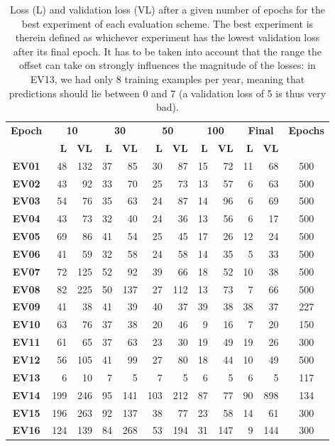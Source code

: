 \begin{table}[h!]
  \centering
  \begin{tabular}{crrrrrrrrrrc}
    \toprule
    \textbf{Epoch} & \multicolumn{2}{c}{\textbf{10}} & \multicolumn{2}{c}{\textbf{30}} & \multicolumn{2}{c}{\textbf{50}} & \multicolumn{2}{c}{\textbf{100}} & \multicolumn{2}{c}{\textbf{Final}} & \textbf{Epochs}\\
    & \textbf{L} & \textbf{VL} & \textbf{L} & \textbf{VL} & \textbf{L} & \textbf{VL} & \textbf{L} & \textbf{VL} & \textbf{L} & \textbf{VL} &  \\
    \midrule
    \textbf{EV01} & 48 & 132 & 37 & 85 & 30 & 87 & 15 & 72 & 11 & 68 & 500 \\
    \textbf{EV02} & 43 & 92 & 33 & 70 & 25 & 73 & 13 & 57 & 6 & 63 & 500 \\
    \textbf{EV03} & 54 & 76 & 35 & 63 & 24 & 87 & 14 & 96 & 6 & 69 & 500 \\
    \textbf{EV04} & 43 & 73 & 32 & 40 & 24 & 36 & 13 & 56 & 6 & 17 & 500 \\
    \textbf{EV05} & 69 & 86 & 41 & 54 & 25 & 45 & 17 & 26 & 12 & 24 & 500 \\
    \textbf{EV06} & 41 & 59 & 32 & 58 & 24 & 58 & 14 & 35 & 5 & 33 & 500 \\
    \textbf{EV07} & 72 & 125    &    52 & 92    &    39 & 66 &    18 & 52 & 10 & 38 & 500 \\
    \textbf{EV08} & 82 & 225    &    50 & 137 & 27 & 112    &    13 & 73 & 7 & 66 & 500 \\
    \textbf{EV09} & 41 & 38 & 41 & 39 & 40 & 37 & 39 & 38 & 38 & 37 & 227 \\
    \textbf{EV10} & 63 & 76 & 37 & 38 & 20 & 46 & 9 & 16 & 7 & 20 & 150 \\
    \textbf{EV11} & 61 & 65 & 37 & 63 & 23 & 30 & 19 & 49 & 19 & 26 & 300 \\
    \textbf{EV12} & 56 & 105    &    41 & 99    &    27 & 80    &    18 & 44 & 10 & 49 & 500 \\
    \textbf{EV13} & 6 & 10    &    7 & 5    &    7 & 5    &    6 & 5 & 6 & 5 & 117 \\
    \textbf{EV14} & 199 & 246 & 95 & 141 & 103 & 212 & 87 & 77 & 90 & 898 & 134 \\
    \textbf{EV15} & 196 & 263 & 92 & 137    &    38 & 77    &    23 & 58 & 14 & 61 & 300 \\
    \textbf{EV16} & 124 & 139 & 84 & 268    &    53 & 194 & 31 & 147 & 9 & 144 & 300 \\
    \bottomrule
  \end{tabular}
  \caption{Loss (L) and validation loss (VL) after a given number of epochs for the best experiment of each evaluation scheme. The best experiment is therein defined as whichever experiment has the lowest validation loss after its final epoch. It has to be taken into account that the range the offset can take on strongly influences the magnitude of the losses: in EV13, we had only 8 training examples per year, meaning that predictions should lie between 0 and 7 (a validation loss of 5 is thus very bad).}
  \label{tab:evaluation_scheme_results}
\end{table}

